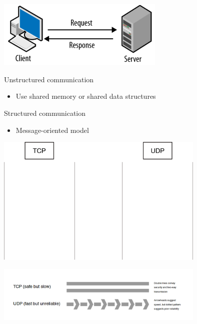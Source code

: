 \begin{slide}


    \includegraphics[width=80mm]{client-server-model.png}
    \bigskip

    Unstructured communication 
    \begin{itemize}
        \item Use shared memory or shared data structures
    \end{itemize}

    Structured communication 
    \begin{itemize}
        \item Message-oriented model
    \end{itemize}

\end{slide}

\begin{slide}


    \includegraphics[width=100mm]{tcp-udp.png}

\end{slide}

\begin{slide}


    \includegraphics[width=100mm]{tcp-udp-2.png}

\end{slide}
    
